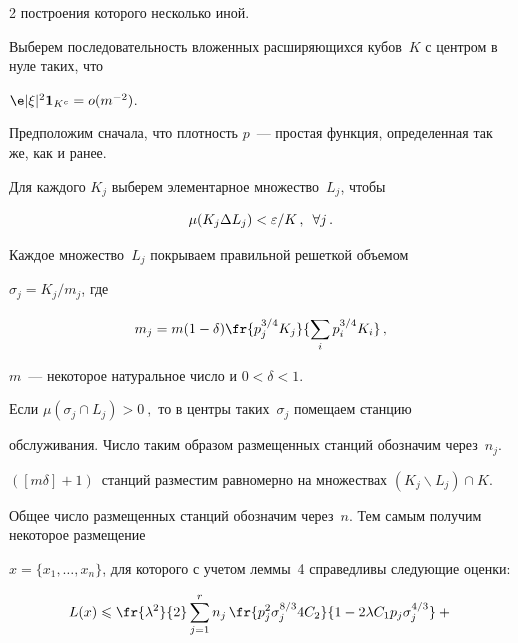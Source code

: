 \begin{multicols}{2}
по\-стро\-ения которого несколько иной.





Выберем последовательность вложенных расширяющихся кубов~$K$ с центром в нуле таких, что


${\e}|\xi|^2 \mathbf{1}_{K^c}=o(m^{-2})$.





Предположим сначала, что плотность $p$~--- прос\-тая функция, определенная так же, как и ранее.





Для каждого $K_j$ выберем элементарное множество~$L_j$, чтобы


$$


\mu(K_j \Delta L_j)<\varepsilon/K\,,\enskip \forall j\,.


$$





Каждое множество~$L_j$ покрываем правильной решеткой объемом


$\sigma_j=K_j/m_j$, где


$$


m_j=m(1-\delta) \fr{p_j^{3/4}K_j}{\suml{i}{} p_i^{3/4}K_i}\,,


$$


$m$~--- некоторое натуральное число и $0<\delta<1$.





Если $\mu(\sigma_j\cap L_j)>0~,$ то в центры таких~$\sigma_j$ помещаем станцию


обслуживания. Число таким образом размещенных станций обозначим через~$n_j$. 


$([m\delta]+1)$~станций разместим равномерно на множествах $(K_j\backslash L_j)\cap K$.





Общее число размещенных станций обозначим через~$n$. Тем самым получим некоторое размещение


$x=\{x_1,\ldots,x_n\}$, для которого с учетом леммы~4 справедливы следующие оценки:


\begin{multline*}


L(x)\leqslant \fr{\lambda^2}{2} \suml{j=1}{r} n_j\, \fr{p_j^2 \sigma_j^{8/3} 4C_2}


{1-2\lambda C_1 p_j \sigma_j^{4/3}}+{}\\[6pt]



\end{multline*}
\end{multicols}
